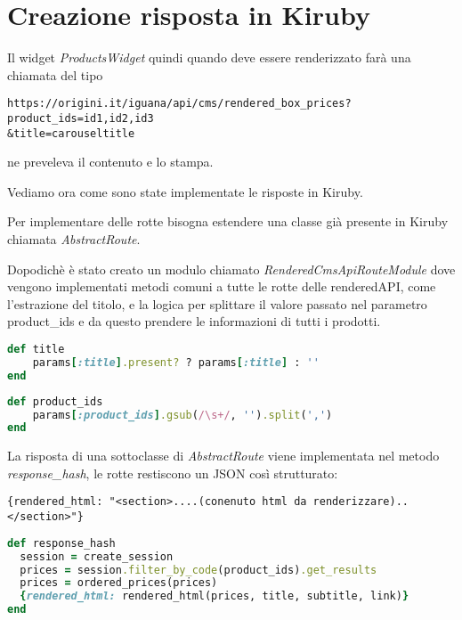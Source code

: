 \section{Creazione risposta in Kiruby}

Il widget \emph{ProductsWidget} quindi quando deve essere renderizzato farà una chiamata del tipo
\begin{verbatim}
https://origini.it/iguana/api/cms/rendered_box_prices?product_ids=id1,id2,id3
&title=carouseltitle
\end{verbatim}
ne preveleva il contenuto e lo stampa.

Vediamo ora come sono state implementate le risposte in Kiruby.

Per implementare delle rotte bisogna estendere una classe già presente in Kiruby chiamata \emph{AbstractRoute}.

Dopodichè è stato creato un modulo chiamato \emph{RenderedCmsApiRouteModule} dove vengono implementati metodi comuni
a tutte le rotte delle renderedAPI, come l'estrazione del titolo, e la logica per splittare il valore passato nel
parametro product\_ids e da questo prendere le informazioni di tutti i prodotti.

\begin{lstlisting}[language=Ruby,caption={Il metodo \emph{title} che preleva il parametro \emph{title} se presente}] 
def title
    params[:title].present? ? params[:title] : ''
end
\end{lstlisting}

\begin{lstlisting}[language=Ruby,caption={Il metodo \emph{product\_ids} trasforma gli ids passati nel parametro in un array}] 
def product_ids
    params[:product_ids].gsub(/\s+/, '').split(',')
end
\end{lstlisting}

La risposta di una sottoclasse di \emph{AbstractRoute} viene implementata nel metodo \emph{response\_hash}, le rotte restiscono un JSON
così strutturato:
\begin{verbatim}
{rendered_html: "<section>....(conenuto html da renderizzare)..</section>"}
\end{verbatim}

\begin{lstlisting}[language=Ruby,caption={Il metodo \emph{response\_hash} dove viene creato il JSON da restituire}] 
def response_hash
  session = create_session
  prices = session.filter_by_code(product_ids).get_results
  prices = ordered_prices(prices)
  {rendered_html: rendered_html(prices, title, subtitle, link)}
end
\end{lstlisting}

